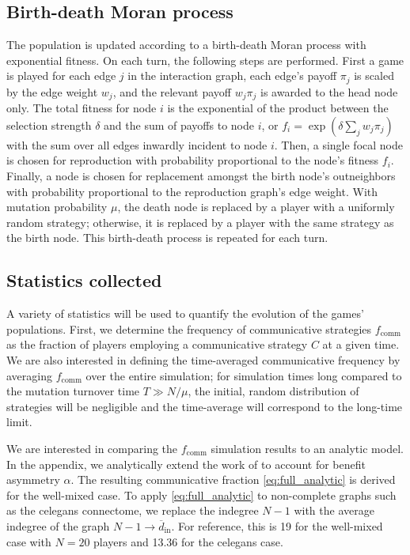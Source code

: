 \documentclass[pdflatex,lineno,referee,sn-mathphys-ay]{sn-jnl}
\begin{document}
\subsection{Birth-death Moran process}
\label{sec:evo_setup}
The population is updated according to a birth-death Moran process
with exponential fitness.
On each turn, the following steps are performed.
First a game is played for each edge $j$ in the interaction graph,
each edge's payoff $\pi_j$ is scaled by the edge weight $w_j$,
and the relevant payoff $w_j \pi_j$ is awarded to the head node only.
The total fitness for node $i$ is the exponential of the product
between the selection strength $\delta$
and the sum of payoffs to node $i$,
or $f_i = \exp(\delta \sum_j w_j \pi_j)$ with the sum
over all edges inwardly incident to node $i$.
Then, a single focal node is chosen for reproduction
with probability proportional to the node's fitness $f_i$.
Finally, a node is chosen for replacement amongst the birth node's outneighbors
with probability proportional to the reproduction graph's edge weight.
With mutation probability $\mu$,
the death node is replaced by a player with a uniformly random strategy;
otherwise, it is replaced by a player with the same strategy as the birth node.
This birth-death process is repeated for each turn.

\subsection{Statistics collected}
\label{sec:stats_setup}
A variety of statistics will be used to quantify the evolution
of the games' populations.
First, we determine the frequency of communicative strategies
$f_{\text{comm}}$ as the fraction of players employing
a communicative strategy $C$ at a given time.
We are also interested in defining the time-averaged communicative frequency
by averaging $f_{\text{comm}}$ over the entire simulation;
for simulation times long compared to the mutation turnover time $T \gg N/\mu$,
the initial, random distribution of strategies will be negligible
and the time-average will correspond to the long-time limit.

We are interested in comparing the $f_{\text{comm}}$ simulation results
to an analytic model.
In the appendix, we analytically extend the work of \citet{tripp2022evolutionary}
to account for benefit asymmetry $\alpha$.
The resulting communicative fraction \cref{eq:full_analytic}
is derived for the well-mixed case.
To apply \cref{eq:full_analytic} to non-complete graphs such as
the \gls{celegans} connectome,
we replace the indegree $N-1$ with the average indegree of the graph
$N-1 \to \overline{d}_{\text{in}}$.
For reference, this is \num{19} for the well-mixed case with $N=20$ players
and \num{13.36} for the \gls{celegans} case.
\end{document}
